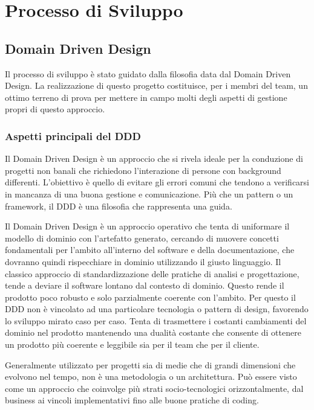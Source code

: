 \chapter{Processo di Sviluppo}

\section{Domain Driven Design}
Il processo di sviluppo è stato guidato dalla filosofia data dal Domain Driven Design. La realizzazione di questo progetto costituisce, per i membri del team, un ottimo terreno di prova per mettere in campo molti degli aspetti di gestione propri di questo approccio.
    \subsection{Aspetti principali del DDD}
    Il Domain Driven Design è un approccio che si rivela ideale per la conduzione di progetti non banali che richiedono l'interazione di persone con background differenti. 
    L'obiettivo è quello di evitare gli errori comuni che tendono a verificarsi in mancanza di una buona gestione e comunicazione. Più che un pattern o un framework, il DDD è una filosofia che rappresenta una guida. 
    
    Il Domain Driven Design è un approccio operativo che tenta di uniformare il modello di dominio con l'artefatto generato, cercando di muovere concetti fondamentali per l'ambito all'interno del software e della documentazione, che dovranno quindi rispecchiare in dominio utilizzando il giusto linguaggio.
    Il classico approccio di standardizzazione delle pratiche di analisi e progettazione, tende a deviare il software lontano dal contesto di dominio. Questo rende il prodotto poco robusto e solo parzialmente coerente con l'ambito.
    Per questo il DDD non è vincolato ad una particolare tecnologia o pattern di design, favorendo lo sviluppo mirato caso per caso.
    Tenta di trasmettere i costanti cambiamenti del dominio nel prodotto mantenendo una dualità costante che consente di ottenere un prodotto più coerente e leggibile sia per il team che per il cliente. 
    
    Generalmente utilizzato per progetti sia di medie che di grandi dimensioni che evolvono nel tempo, non è una metodologia o un architettura. Può essere visto come un approccio che coinvolge più strati socio-tecnologici orizzontalmente, dal business ai vincoli implementativi fino alle buone pratiche di coding.
    
